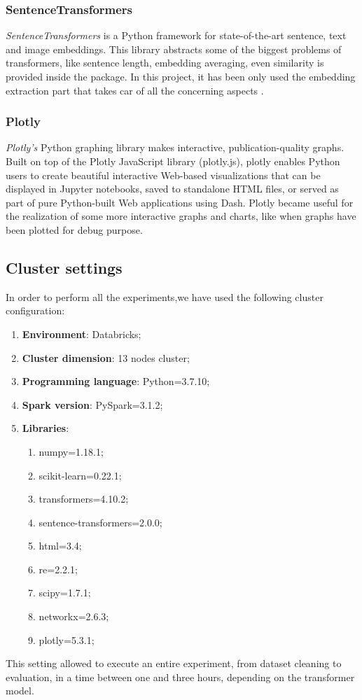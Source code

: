 \documentclass[\main/main.tex]{subfiles}
\begin{document}
\subsubsection{SentenceTransformers}
\emph{SentenceTransformers} is a Python framework for state-of-the-art sentence, text and image embeddings. This library abstracts some of the biggest problems of transformers, like sentence length, embedding averaging, even similarity is provided inside the package. In this project, it has been only used the embedding extraction part that takes car of all the concerning aspects \cite{sentence-transformers}.
\subsubsection{Plotly}
\emph{Plotly's} \cite{plotly} Python graphing library makes interactive, publication-quality graphs. Built on top of the Plotly JavaScript library (plotly.js), plotly enables Python users to create beautiful interactive Web-based visualizations that can be displayed in Jupyter notebooks, saved to standalone HTML files, or served as part of pure Python-built Web applications using Dash. Plotly became useful for the realization of some more interactive graphs and charts, like when graphs have been plotted for debug purpose.
\subsection{Cluster settings}
In order to perform all the experiments,we have used the following cluster configuration:
\begin{enumerate}
    \item \textbf{Environment}: Databricks;
    \item \textbf{Cluster dimension}: 13 nodes cluster;
    \item \textbf{Programming language}: Python=3.7.10;
    \item \textbf{Spark version}: PySpark=3.1.2;
    \item \textbf{Libraries}: 
        \begin{enumerate}
            \item numpy=1.18.1;
            \item scikit-learn=0.22.1;
            \item transformers=4.10.2;
            \item sentence-transformers=2.0.0;
            \item html=3.4;
            \item re=2.2.1;
            \item scipy=1.7.1;
            \item networkx=2.6.3;
            \item plotly=5.3.1;
        \end{enumerate}
\end{enumerate}
This setting allowed to execute an entire experiment, from dataset cleaning to evaluation, in a time between one and three hours, depending on the transformer model.
\end{document}
